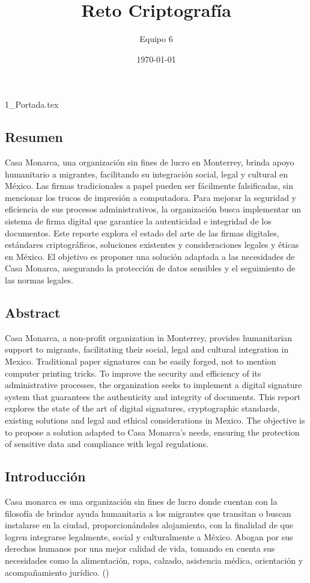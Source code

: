 \documentclass[12pt]{article}
\title{Reto Criptografía}
\author{Equipo 6}
\date{\today}
\begin{document}
{1_Portada.tex}
\newpage
\tableofcontents %
\thispagestyle{empty}

\newpage
\subsection{Resumen} %
Casa Monarca, una organización sin fines de lucro en Monterrey, brinda apoyo humanitario a migrantes, facilitando su integración social, legal y cultural en México. Las firmas tradicionales a papel pueden ser fácilmente falsificadas, sin mencionar los trucos de impresión a computadora. Para mejorar la seguridad y eficiencia de sus procesos administrativos, la organización busca implementar un sistema de firma digital que garantice la autenticidad e integridad de los documentos. Este reporte explora el estado del arte de las firmas digitales, estándares criptográficos, soluciones existentes y consideraciones legales y éticas en México. El objetivo es proponer una solución adaptada a las necesidades de Casa Monarca, asegurando la protección de datos sensibles y el seguimiento de las normas legales.

\subsection{Abstract}%
Casa Monarca, a non-profit organization in Monterrey, provides humanitarian support to migrants, facilitating their social, legal and cultural integration in Mexico. Traditional paper signatures can be easily forged, not to mention computer printing tricks. To improve the security and efficiency of its administrative processes, the organization seeks to implement a digital signature system that guarantees the authenticity and integrity of documents. This report explores the state of the art of digital signatures, cryptographic standards, existing solutions and legal and ethical considerations in Mexico. The objective is to propose a solution adapted to Casa Monarca's needs, ensuring the protection of sensitive data and compliance with legal regulations.
\newpage

\subsection{Introducción} %
Casa monarca es una organización sin fines de lucro donde cuentan con la filosofía de brindar ayuda humanitaria a los migrantes que transitan o buscan instalarse en la ciudad, proporcionándoles alojamiento, con la finalidad de que logren integrarse legalmente, social y culturalmente a México. Abogan por sus derechos humanos por una mejor calidad de vida, tomando en cuenta sus necesidades como la alimentación, ropa, calzado, asistencia médica, orientación y acompañamiento jurídico. (\cite{CasaMonarca})
\end{document}
